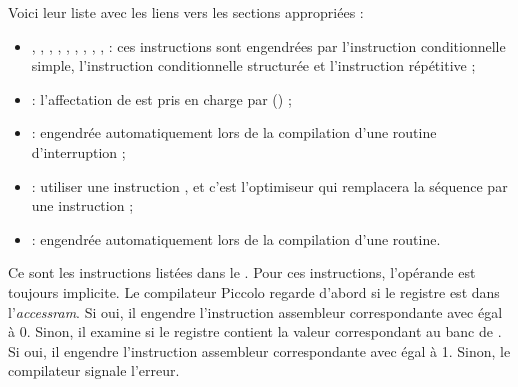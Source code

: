 Voici leur liste avec les liens vers les sections appropriées :\begin{itemize}
  \item {}, , , , , , , , ,  : ces instructions sont engendrées par l’instruction conditionnelle simple, l’instruction conditionnelle structurée et l’instruction répétitive ;
  \item {} : l’affectation de  est pris en charge par  () ;
  \item {} : engendrée automatiquement lors de la compilation d’une routine d’interruption ;
  \item {} : utiliser une instruction , et c’est l’optimiseur qui remplacera la séquence  par une instruction  ;
  \item {} : engendrée automatiquement lors de la compilation d’une routine.

\end{itemize}








Ce sont les instructions listées dans le . Pour ces instructions, l'opérande  est toujours implicite. Le compilateur Piccolo regarde d'abord si le registre  est dans l'\emph{accessram}. Si oui, il engendre l'instruction assembleur correspondante avec  égal à 0. Sinon, il examine si le registre  contient la valeur correspondant au banc de . Si oui, il engendre l'instruction assembleur correspondante avec  égal à 1. Sinon, le compilateur signale l'erreur.



